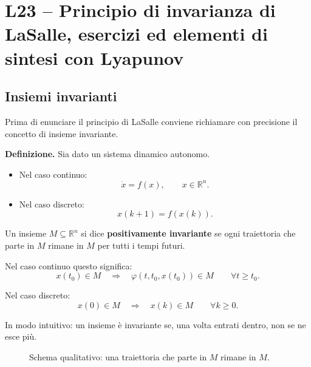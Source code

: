 
\chapter{L23 -- Principio di invarianza di LaSalle, esercizi ed elementi di sintesi con Lyapunov}
\label{chap:L23}

\section{Insiemi invarianti}

Prima di enunciare il principio di LaSalle conviene richiamare con precisione il concetto di insieme invariante.

\medskip

\noindent
\textbf{Definizione.}
Sia dato un sistema dinamico autonomo.

\begin{itemize}
    \item Nel caso continuo:
    \[
    \dot x = f(x), \qquad x\in\mathbb{R}^n.
    \]
    \item Nel caso discreto:
    \[
    x(k+1)=f(x(k)).
    \]
\end{itemize}

Un insieme \(M\subseteq \mathbb{R}^n\) si dice \textbf{positivamente invariante} se ogni traiettoria che parte in \(M\) rimane in \(M\) per tutti i tempi futuri.

Nel caso continuo questo significa:
\[
x(t_0)\in M
\quad \Longrightarrow \quad
\varphi(t,t_0,x(t_0))\in M
\qquad \forall t\ge t_0.
\]

Nel caso discreto:
\[
x(0)\in M
\quad \Longrightarrow \quad
x(k)\in M
\qquad \forall k\ge 0.
\]

\medskip

\noindent
In modo intuitivo: un insieme è invariante se, una volta entrati dentro, non se ne esce più.

\begin{figure}[h!]
\centering
{}
\caption{Schema qualitativo: una traiettoria che parte in \(M\) rimane in \(M\).}
\end{figure}

